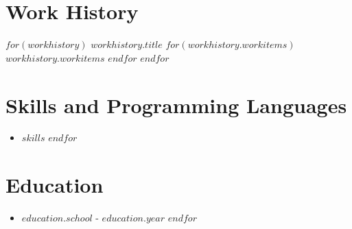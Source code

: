 \documentclass{res}
\begin{document}
\section{Work History}
$for(workhistory)$
\textit{$workhistory.title$}
\workitems
$for(workhistory.workitems)$
{$workhistory.workitems$}
$endfor$
$endfor$
\section{Skills and Programming Languages}
\begin{itemize}
\setlength\itemsep{-0.5em}
$for(skills)$
\item\normalsize $skills$
$endfor$
\end{itemize}
\section{Education}
\begin{itemize}
\setlength\itemsep{-0.5em}
$for(education)$
\item\normalsize{$education.school$} - \normalsize{$education.year$}
$endfor$
\end{itemize}
\end{document}
